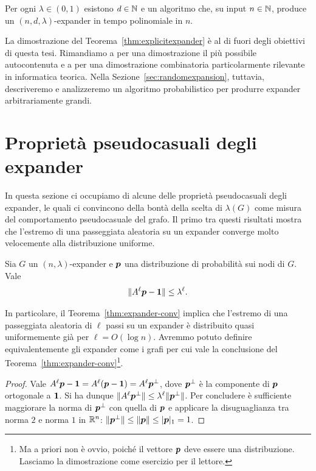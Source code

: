 \begin{theorem} \label{thm:explicitexpander}
	Per ogni $\lambda \in (0, 1)$ esistono $d \in \mathbb{N}$ e un algoritmo che, su input
	$n \in \mathbb{N}$, produce un $(n, d, \lambda)$-expander in tempo polinomiale in $n$.
\end{theorem}

La dimostrazione del Teorema~\ref{thm:explicitexpander} è al di fuori degli
obiettivi di questa tesi. Rimandiamo a \cite{ABbook} per una dimostrazione il
più possibile autocontenuta e a \cite{RVW02} per una dimostrazione combinatoria
particolarmente rilevante in informatica teorica.
Nella Sezione~\ref{sec:randomexpansion}, tuttavia, descriveremo e analizzeremo
un algoritmo probabilistico per produrre expander arbitrariamente grandi.

\section{Proprietà pseudocasuali degli expander}

In questa sezione ci occupiamo di alcune delle proprietà pseudocasuali degli
expander, le quali ci convincono della bontà della scelta di $\lambda(G)$ come
misura del comportamento pseudocasuale del grafo.
Il primo tra questi risultati mostra che l'estremo di una passeggiata aleatoria
su un expander converge molto velocemente alla distribuzione uniforme.

\begin{theorem} \label{thm:expander-conv}
	Sia $G$ un $(n, \lambda)$-expander e $\bm{p}$ una distribuzione di probabilità
	sui nodi di $G$. Vale
	\[
		\lVert A^\ell \bm{p} - \bm{1}\rVert \le \lambda^\ell.
	\]
\end{theorem}

In particolare, il Teorema~\ref{thm:expander-conv} implica che l'estremo di una
passeggiata aleatoria di $\ell$ passi su un expander è distribuito quasi
uniformemente già per $\ell = O(\log n)$.
Avremmo potuto definire equivalentemente gli expander come i grafi per cui
vale la conclusione del Teorema~\ref{thm:expander-conv}\footnote{Ma a priori non
è ovvio, poiché il vettore $\bm{p}$ deve essere una distribuzione. Lasciamo la
dimostrazione come esercizio per il lettore.}.

\begin{proof}
	Vale $A^\ell \bm{p} - \bm{1} = A^\ell (\bm{p} - \bm{1}) = A^\ell \bm{p}^\perp$, dove
	$\bm{p}^\perp$ è la componente di $\bm{p}$ ortogonale a $\bm{1}$. Si ha dunque
	$\lVert A^\ell \bm{p}^\perp\rVert \le \lambda^\ell \lVert\bm{p}^\perp\rVert$.
	Per concludere è sufficiente maggiorare la norma di $\bm{p}^\perp$ con quella
	di $\bm{p}$ e applicare la disuguaglianza tra norma $2$ e norma $1$ in
	$\mathbb{R}^n$: $\lVert\bm{p}^\perp\rVert \le \lVert\bm{p}\rVert \le \lvert \bm{p} \rvert_1 = 1$.
\end{proof}

